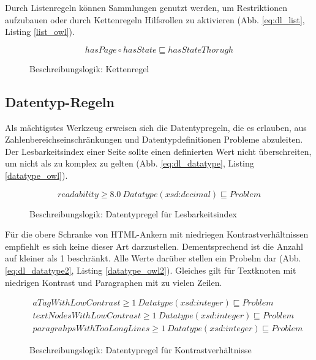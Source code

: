 \documentclass[runningheads,a4paper]{llncs}
\begin{document}
Durch Listenregeln können Sammlungen genutzt werden, um Restriktionen aufzubauen oder durch Kettenregeln Hilfsrollen zu aktivieren (Abb. \ref{eq:dl_list}, Listing \ref{list_owl}).

\begin{figure}
\begin{equation}
hasPage \circ hasState \sqsubseteq hasStateThorugh
\label{eq:dl_list}
\end{equation}
\caption{Beschreibungslogik: Kettenregel}
\end{figure}



\subsection{Datentyp-Regeln}
\label{sec:rule_datatype}

Als mächtigstes Werkzeug erweisen sich die Datentypregeln, die es erlauben, aus Zahlenbereichseinschränkungen und Datentypdefinitionen Probleme abzuleiten. 
Der Lesbarkeitsindex einer Seite sollte einen definierten Wert nicht überschreiten, um nicht als zu komplex zu gelten (Abb. \ref{eq:dl_datatype}, Listing \ref{datatype_owl}).


\begin{figure}
\begin{equation}
readability \geq 8.0\ Datatype(\textit{xsd:decimal}) \sqsubseteq Problem
\label{eq:dl_datatype}
\end{equation}
\caption{Beschreibungslogik: Datentypregel für Lesbarkeitsindex}
\end{figure}



Für die obere Schranke von HTML-Ankern mit niedriegen Kontrastverhältnissen empfiehlt es sich keine dieser Art darzustellen.
Dementsprechend ist die Anzahl auf kleiner als 1 beschränkt.
Alle Werte darüber stellen ein Probelm dar (Abb. \ref{eq:dl_datatype2}, Listing \ref{datatype_owl2}).
Gleiches gilt für Textknoten mit niedrigen Kontrast und Paragraphen mit zu vielen Zeilen.

\newpage

\begin{figure}
\begin{equation}
\begin{aligned}
aTagWithLowContrast \geq 1\ Datatype(\textit{xsd:integer}) \sqsubseteq Problem \\
textNodesWithLowContrast \geq 1\ Datatype(\textit{xsd:integer}) \sqsubseteq Problem \\
paragrahpsWithTooLongLines \geq 1\ Datatype(\textit{xsd:integer}) \sqsubseteq Problem
\label{eq:dl_datatype2}
\end{aligned}
\end{equation}
\caption{Beschreibungslogik: Datentypregel für Kontrastverhältnisse}
\end{figure}
\end{document}

